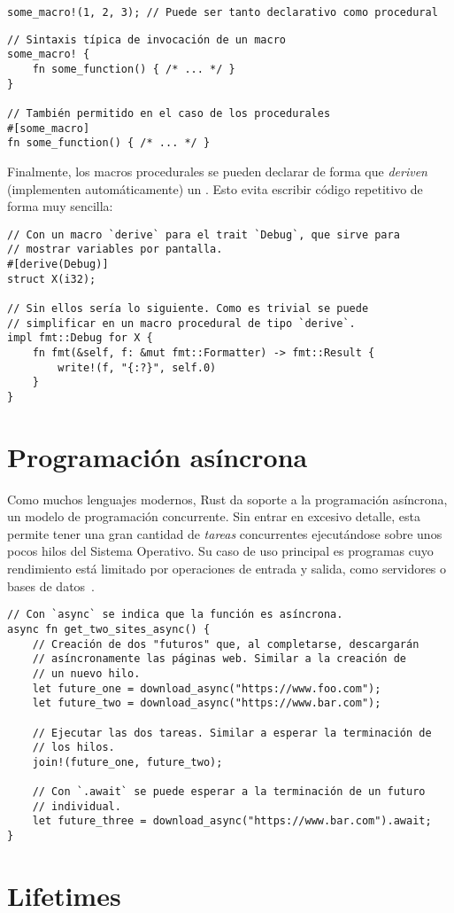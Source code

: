 \begin{verbatim}
some_macro!(1, 2, 3); // Puede ser tanto declarativo como procedural
\end{verbatim}

\begin{verbatim}
// Sintaxis típica de invocación de un macro
some_macro! {
    fn some_function() { /* ... */ }
}

// También permitido en el caso de los procedurales
#[some_macro]
fn some_function() { /* ... */ }
\end{verbatim}

Finalmente, los macros procedurales se pueden declarar de forma que
\emph{deriven} (implementen automáticamente) un \trait. Esto evita escribir
código repetitivo de forma muy sencilla:

\begin{verbatim}
// Con un macro `derive` para el trait `Debug`, que sirve para
// mostrar variables por pantalla.
#[derive(Debug)]
struct X(i32);

// Sin ellos sería lo siguiente. Como es trivial se puede
// simplificar en un macro procedural de tipo `derive`.
impl fmt::Debug for X {
    fn fmt(&self, f: &mut fmt::Formatter) -> fmt::Result {
        write!(f, "{:?}", self.0)
    }
}
\end{verbatim}

\section{Programación asíncrona}

Como muchos lenguajes modernos, Rust da soporte a la programación asíncrona, un
modelo de programación concurrente. Sin entrar en excesivo detalle, esta permite
tener una gran cantidad de \emph{tareas} concurrentes ejecutándose sobre unos
pocos hilos del Sistema Operativo. Su caso de uso principal es programas cuyo
rendimiento está limitado por operaciones de entrada y salida, como servidores o
bases de datos~\cite{rustasyncbook}.

\begin{verbatim}
// Con `async` se indica que la función es asíncrona.
async fn get_two_sites_async() {
    // Creación de dos "futuros" que, al completarse, descargarán
    // asíncronamente las páginas web. Similar a la creación de
    // un nuevo hilo.
    let future_one = download_async("https://www.foo.com");
    let future_two = download_async("https://www.bar.com");

    // Ejecutar las dos tareas. Similar a esperar la terminación de
    // los hilos.
    join!(future_one, future_two);

    // Con `.await` se puede esperar a la terminación de un futuro
    // individual.
    let future_three = download_async("https://www.bar.com").await;
}
\end{verbatim}

\section{Lifetimes}


